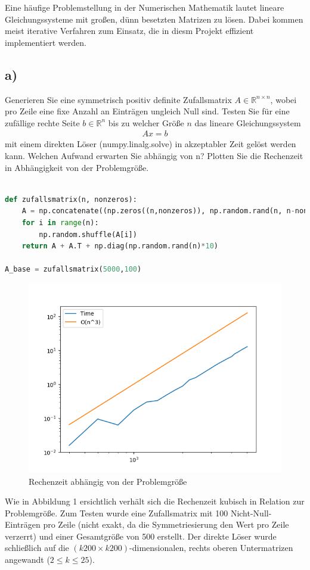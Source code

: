 Eine häufige Problemstellung in der Numerischen Mathematik lautet lineare Gleichungssysteme mit großen, dünn besetzten Matrizen zu lösen.
Dabei kommen meist iterative Verfahren zum Einsatz, die in diesm Projekt effizient implementiert werden.
\subsection*{a)}
Generieren Sie eine symmetrisch positiv definite Zufallsmatrix $A \in \mathbb{R}^{n\times n}$, wobei pro Zeile eine fixe Anzahl an Einträgen
ungleich Null sind. Testen Sie für eine zufällige rechte Seite $b \in \mathbb{R}^n$ bis zu welcher Größe $n$ das lineare
Gleichungssystem
\begin{align*}
  Ax = b
\end{align*}
mit einem direkten Löser (numpy.linalg.solve) in akzeptabler Zeit gelöst werden kann.
Welchen Aufwand erwarten Sie abhängig von n? Plotten Sie die Rechenzeit in Abhängigkeit von der Problemgröße.
\begin{lstlisting}[language=Python]

def zufallsmatrix(n, nonzeros):
	A = np.concatenate((np.zeros((n,nonzeros)), np.random.rand(n, n-nonzeros)), axis = 1)
	for i in range(n):
		np.random.shuffle(A[i])
	return A + A.T + np.diag(np.random.rand(n)*10)

A_base = zufallsmatrix(5000,100)
\end{lstlisting}
\begin{figure}
    \centering
    \includegraphics[width=\linewidth]{Aufgabe_1/plot_a.png}
    \caption{Rechenzeit abhängig von der Problemgröße}
    \label{fig:my_label}
\end{figure}
Wie in Abbildung 1 ersichtlich verhält sich die Rechenzeit kubisch in Relation zur Problemgröße.
Zum Testen wurde eine Zufallsmatrix mit 100 Nicht-Null-Einträgen pro Zeile (nicht exakt, da die Symmetriesierung den Wert pro
Zeile verzerrt) und einer Gesamtgröße von 500 erstellt. Der direkte Löser wurde schließlich auf die $(k200 \times k200)$-dimensionalen,
rechts oberen Untermatrizen angewandt ($2 \leq k \leq 25$).
\FloatBarrier
